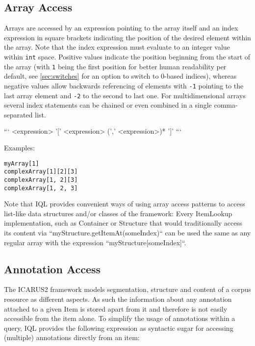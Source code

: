 \documentclass[11pt]{article}
\begin{document}
\subsection{Array Access}
\label{sec:array-access}

Arrays are accessed by an expression pointing to the array itself and an index expression in square brackets indicating the position of the desired element within the array. Note that the index expression must evaluate to an integer value within \texttt{int} space. Positive values indicate the position beginning from the start of the array (with \texttt{1} being the first position for better human readability per default, see \cref{sec:switches} for an option to switch to 0-based indices), whereas negative values allow backwards referencing of elements with \texttt{-1} pointing to the last array element and \texttt{-2} to the second to last one. For multidimensional arrays several index statements can be chained or even combined in a single comma-separated list.

```
<expression> '[' <expression> (',' <expression>)* ']'
```

Examples:

\begin{verbatim}
myArray[1]
complexArray[1][2][3]
complexArray[1, 2][3]
complexArray[1, 2, 3]
\end{verbatim}

Note that IQL provides convenient ways of using array access patterns to access list-like data structures and/or classes of the framework:
Every ItemLookup implementation, such as Container or Structure that would traditionally access its content via ``myStructure.getItemAt(someIndex)`` can be used the same as any regular array with the expression ``myStructure[someIndex]``.

\subsection{Annotation Access}
\label{sec:annotation-access}

The ICARUS2 framework models segmentation, structure and content of a corpus resource as different aspects. As such the information about any annotation attached to a given Item is stored apart from it and therefore is not easily accessible from the item alone. To simplify the usage of annotations within a query, IQL provides the following expression as syntactic sugar for accessing (multiple) annotations directly from an item:
\end{document}
